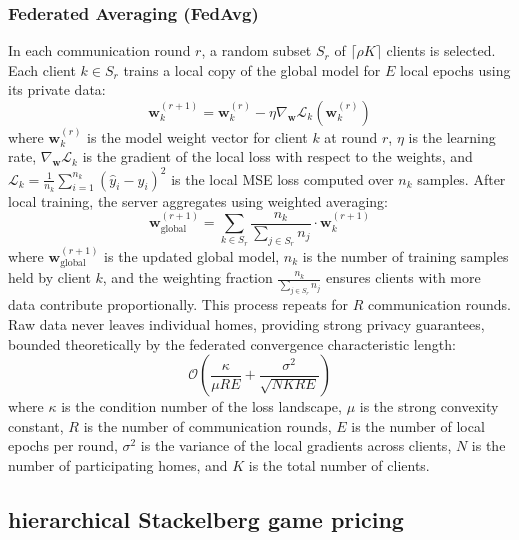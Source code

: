 \documentclass[journal]{IEEEtran}
\begin{document}
\subsubsection{Federated Averaging (FedAvg)} In each communication round $r$, a random subset $S_r$ of $\lceil \rho K \rceil$ clients is selected. Each client $k \in S_r$ trains a local copy of the global model for $E$ local epochs using its private data:
\begin{equation}
    \mathbf{w}_k^{(r+1)} = \mathbf{w}_k^{(r)} - \eta \nabla_{\mathbf{w}} \mathcal{L}_k(\mathbf{w}_k^{(r)})
    \label{eq:local_sgd}
\end{equation}
where $\mathbf{w}_k^{(r)}$ is the model weight vector for client $k$ at round $r$, $\eta$ is the learning rate, $\nabla_{\mathbf{w}} \mathcal{L}_k$ is the gradient of the local loss with respect to the weights, and $\mathcal{L}_k = \frac{1}{n_k}\sum_{i=1}^{n_k}(\hat{y}_i - y_i)^2$ is the local MSE loss computed over $n_k$ samples. After local training, the server aggregates using weighted averaging:
\begin{equation}
    \mathbf{w}_{\text{global}}^{(r+1)} = \sum_{k \in S_r} \frac{n_k}{\sum_{j \in S_r} n_j} \cdot \mathbf{w}_k^{(r+1)}
    \label{eq:fedavg}
\end{equation}
where $\mathbf{w}_{\text{global}}^{(r+1)}$ is the updated global model, $n_k$ is the number of training samples held by client $k$, and the weighting fraction $\frac{n_k}{\sum_{j \in S_r} n_j}$ ensures clients with more data contribute proportionally.
This process repeats for $R$ communication rounds. Raw data never leaves individual homes, providing strong privacy guarantees, bounded theoretically by the federated convergence characteristic length:
\begin{equation}
    \mathcal{O}\left(\frac{\kappa}{\mu R E} + \frac{\sigma^2}{\sqrt{N K R E}}\right)
    \label{eq:fed_convergence}
\end{equation}
where $\kappa$ is the condition number of the loss landscape, $\mu$ is the strong convexity constant, $R$ is the number of communication rounds, $E$ is the number of local epochs per round, $\sigma^2$ is the variance of the local gradients across clients, $N$ is the number of participating homes, and $K$ is the total number of clients.



\subsection{hierarchical Stackelberg game pricing}
\end{document}
